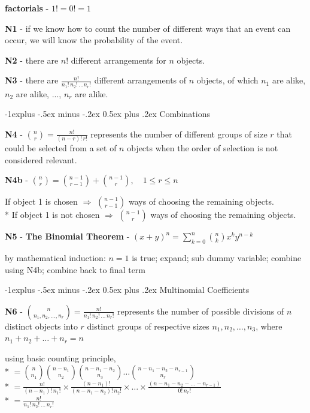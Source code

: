 \documentclass[10pt, landscape]{article}
\makeatletter
\renewcommand{\subsection}{\@startsection{subsection}{2}{0mm}%
  {-1explus -.5ex minus -.2ex}%
  {0.5ex plus .2ex}%
{\normalfont\normalsize\bfseries}}
\makeatother
\begin{document}
\begin{multicols*}{3}
  \textbf{factorials} - $1! = 0! = 1$

  \textbf{N1} - if we know how to count the number of different ways that an event can occur, we will know the probability of the event.

  \textbf{N2} - there are $n!$ different arrangements for $n$ objects.

  \textbf{N3} - there are $\frac{n!}{n_1!\, n_2!\, \dots n_r!}$ different arrangements of $n$ objects, 
  of which $n_1$ are alike, $n_2$ are alike, ..., $n_r$ are alike.

  \subsection{Combinations}

  \textbf{N4} - $\binom{n}{r} = \frac{n!}{(n-r)!\,r!}$ represents the number of different groups of size $r$ that could be selected from a set of $n$ objects when the order of selection is not considered relevant.

  \textbf{N4b} - $\binom{n}{r} = \binom{n-1}{r-1} + \binom{n-1}{r}, \quad 1 \leq r \leq n$
  \begin{niceproof}
    If object 1 is chosen $\Rightarrow$ $\binom{n-1}{r-1}$ ways of choosing the remaining objects.
    \\* If object 1 is not chosen $\Rightarrow$ $\binom{n-1}{r}$ ways of choosing the remaining objects.
  \end{niceproof}

  \textbf{N5} - \textbf{The Binomial Theorem} - \( {\displaystyle{(x+y)^n = \sum^n_{k=0} \binom{n}{k} x^k y^{n-k} }} \) 
  \begin{niceproof}
    by mathematical induction: $n=1$ is true; expand; sub dummy variable; combine using N4b; combine back to final term
  \end{niceproof}

  \subsection{Multinomial Coefficients}

  \textbf{N6} - $\binom{n}{n_1, n_2, \dots, n_r} = \frac{n!}{n_1!\, n_2!\, \dots \, n_r!}$  
  represents the number of possible divisions of $n$ distinct objects 
  into $r$ distinct groups of respective sizes $n_1, n_2, \dots, n_3$, 
  where $n_1 + n_2 + \dots + n_r = n$
  \begin{niceproof}
    using basic counting principle, 
    \\* $= \binom{n}{n_1} \binom{n-n_1}{n_2} \binom{n-n_1-n_2}{n_3} \dots \binom{n-n_1-n_2-n_{r-1}}{n_r}$
    \\* $= \frac{n!}{(n-n_1)!\,n_1!} \times \frac{(n-n_1)!}{(n-n_1-n_2)!\, n_2!} \times \dots \times \frac{( n-n_1-n_2-\dots -n_{r-1} )}{0!\, n_r!}$
    \\* $= \frac{n!}{n_1!\, n_2! \, \dots \, n_r!}$
  \end{niceproof}


\end{multicols*}
\end{document}
